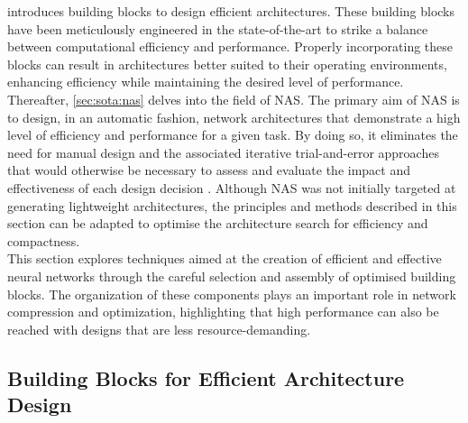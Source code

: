  introduces building blocks to design efficient
architectures. These building blocks have been meticulously engineered in the
state-of-the-art to strike a balance between computational efficiency and
performance. Properly incorporating these blocks can result in architectures
better suited to their operating environments, enhancing efficiency while
maintaining the desired level of performance.\\

Thereafter, \cref{sec:sota:nas} delves into the field of \acl{NAS}. The primary
aim of \ac{NAS} is to design, in an automatic fashion, network architectures
that demonstrate a high level of efficiency and performance for a given task. By
doing so, it eliminates the need for manual design and the associated iterative
trial-and-error approaches that would otherwise be necessary to assess and
evaluate the impact and effectiveness of each design decision
\cite{DBLP:journals/corr/HowardZCKWWAA17,DBLP:conf/cvpr/SandlerHZZC18,DBLP:conf/iccv/HowardPALSCWCTC19}.
Although \ac{NAS} was not initially targeted at generating lightweight
architectures, the principles and methods described in this section can be
adapted to optimise the architecture search for efficiency and compactness. \\

This section explores techniques aimed at the creation of efficient and
effective neural networks through the careful selection and assembly of
optimised building blocks. The organization of these components plays an
important role in network compression and optimization, highlighting that high
performance can also be reached with designs that are less
resource-demanding.\\

\subsection{Building Blocks for Efficient Architecture Design}\label{sec:sota:efficient_archi}

